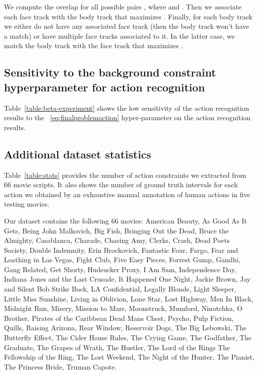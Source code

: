 \documentclass[10pt,twocolumn,letterpaper]{article}
\begin{document}
 We compute the overlap for all possible pairs , where  and .
 Then we associate each face track  with the body track  that maximizes . Finally, for each body track  we 
 either do not have any associated face track (then the body track won't have a match) or have multiple face tracks  associated to it. In the latter case, we match
 the body track  with the face track  that maximizes .

\begin{table}[t]
  \caption{Influence of the hyper-parameter ~\eqref{eq:background-constraint} for action recognition.}
     \label{table:beta-experiment}
\end{table}


\subsection{Sensitivity to the background constraint hyperparameter for action recognition}
\label{sec:beta-exp}
Table~\ref{table:beta-experiment} shows the low sensitivity of the action recognition results to the ~\eqref{eq:finalproblemaction} hyper-parameter on the action recognition results.

\subsection{Additional dataset statistics}
\label{sec:stats}
 Table~\ref{table:stats} provides the number of action constraints we extracted from 66 movie scripts. It also shows the number of ground truth intervals for each action we obtained by an exhaustive manual annotation of human actions in five testing movies.

Our dataset contains the following 66 movies: 
\normalsize{American Beauty, As Good As It Gets, Being John Malkovich, Big Fish, Bringing Out the Dead, Bruce the Almighty, Casablanca, Charade, Chasing Amy, Clerks, Crash, Dead Poets Society, Double Indemnity, Erin Brockovich, Fantastic Four, Fargo, Fear and Loathing in Las Vegas, Fight Club, Five Easy Pieces, Forrest Gump, Gandhi, Gang Related, Get Shorty, Hudsucker Proxy, I Am Sam, Independence Day, Indiana Jones and the Last Crusade, It Happened One Night, Jackie Brown, Jay and Silent Bob Strike Back, LA Confidential, Legally Blonde, Light Sleeper, Little Miss Sunshine, Living in Oblivion, Lone Star, Lost Highway, Men In Black, Midnight Run, Misery, Mission to Mars, Moonstruck, Mumford, Ninotchka, O Brother, Pirates of the Caribbean Dead Mans Chest, Psycho, Pulp Fiction, Quills, Raising Arizona, Rear Window, Reservoir Dogs, The Big Lebowski, The Butterfly Effect, The Cider House Rules, The Crying Game, The Godfather, The Graduate, The Grapes of Wrath, The Hustler, The Lord of the Rings The Fellowship of the Ring, The Lost Weekend, The Night of the Hunter, The Pianist, The Princess Bride, Truman Capote.}
\end{document}
